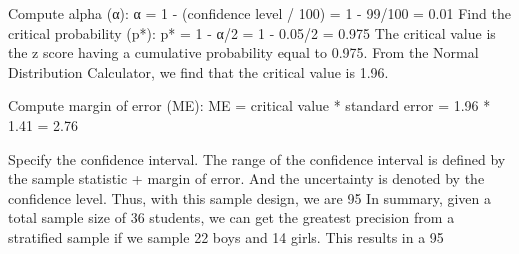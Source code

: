 Compute alpha (α): α = 1 - (confidence level / 100) = 1 - 99/100 = 0.01
Find the critical probability (p*): p* = 1 - α/2 = 1 - 0.05/2 = 0.975
The critical value is the z score having a cumulative probability equal to 0.975. From the Normal Distribution Calculator, we find that the critical value is 1.96.

Compute margin of error (ME): ME = critical value * standard error = 1.96 * 1.41 = 2.76

Specify the confidence interval. The range of the confidence interval is defined by the sample statistic + margin of error. And the uncertainty is denoted by the confidence level. Thus, with this sample design, we are 95%
In summary, given a total sample size of 36 students, we can get the greatest precision from a stratified sample if we sample 22 boys and 14 girls. This results in a 95%
